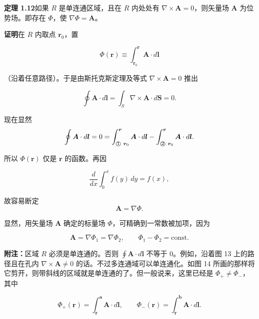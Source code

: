 \documentclass[11pt,a4paper,oneside]{ctexbook}
\newcommand{\ve}[1]{\bm{#1}}
\begin{document}
\textbf{定理 1.12}\quad 如果 $R$ 是单连通区域，且在 $R$ 内处处有 $\nabla \times \ve{A} = 0$，则矢量场 $\ve{A}$ 为位势场。即存在 $\Phi$，使 $\nabla\Phi = \ve{A}$。

\textbf{证明}\quad 在 $R$ 内取点 $\ve{r}_0$，置

\begin{equation*}
\Phi(\ve{r}) \equiv \int_{\ve{r}_0}^{\ve{r}} \ve{A} \cdot d\ve{l}
\end{equation*}

（沿着任意路径）。于是由斯托克斯定理及等式 $\nabla \times \ve{A} = 0$ 推出

\begin{equation*}
\oint \ve{A} \cdot d\ve{l} = \int_{S} \nabla \times \ve{A} \cdot d\ve{S} = 0.
\end{equation*}

现在显然
\begin{equation*}
\oint \ve{A} \cdot d\ve{l} = 0 = \int_{\text{\textcircled{\scriptsize 1}}\ \ve{r}_0}^{\ve{r}} \ve{A} \cdot d\ve{l} - \int_{\text{\textcircled{\scriptsize 2}}\ \ve{r}_0}^{\ve{r}} \ve{A} \cdot d\ve{l}.
\end{equation*}

所以 $\Phi(\ve{r})$ 仅是 $\ve{r}$ 的函数。再因

\begin{equation*}
\frac{d}{dx} \int_{0}^{x} f(y)\, dy = f(x),
\end{equation*}

故容易断定
\begin{equation*}
\ve{A} = \nabla\Phi.
\end{equation*}

显然，用矢量场 $\ve{A}$ 确定的标量场 $\Phi$，可精确到一常数被加项，因为

\begin{equation*}
\ve{A} = \nabla\Phi_1 = \nabla\Phi_2, \qquad \Phi_1 - \Phi_2 = \text{const}.
\end{equation*}

\textbf{附注：}区域 $R$ 必须是单连通的。否则 $\oint \ve{A} \cdot d\ve{l}$ 不等于 0。例如，沿着图 13 上的路径且在孔内 $\nabla \times \ve{A} \neq 0$ 的话。不过多连通域可以单连通化。如图 14 所画的那样将它剪开，则带斜线的区域就是单连通的了。但一般说来，这里已经是 $\Phi_{+} \neq \Phi_{-}$，其中

\begin{equation*}
\Phi_{+}(\ve{r}) = \int_{\ve{r}}^{\ve{a}} \ve{A} \cdot d\ve{l}, \qquad \Phi_{-}(\ve{r}) = \int_{\ve{r}}^{\ve{b}} \ve{A} \cdot d\ve{l}.
\end{equation*}
\end{document}
